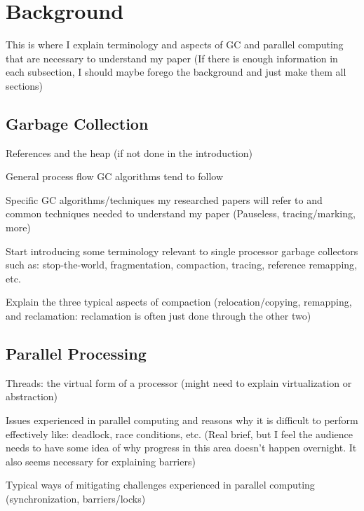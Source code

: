 \documentclass{sig-alternate}
\begin{document}
\section{Background}
\label{sec:background}


This is where I explain terminology and aspects of GC and parallel 
computing that are necessary to understand my paper (If there is 
enough information in each subsection, I should maybe forego the 
background and just make them all sections)

\subsection{Garbage Collection}
\label{sec:garbageCollection}

References and the heap (if not done in the introduction)

General process flow GC algorithms tend to follow

Specific GC algorithms/techniques my researched papers will 
refer to and common techniques needed to understand my paper 
(Pauseless, tracing/marking, more)

Start introducing some terminology relevant to single processor 
garbage collectors such as: stop-the-world, fragmentation, compaction, 
tracing, reference remapping, etc.

Explain the three typical aspects of compaction 
(relocation/copying, remapping, and reclamation: 
reclamation is often just done through the other two)

\subsection{Parallel Processing}
\label{sec:parallelProcessing}

Threads: the virtual form of a processor (might need to 
explain virtualization or abstraction)

Issues experienced in parallel computing and reasons why it 
is difficult to perform effectively like: deadlock, race conditions, 
etc. (Real brief, but I feel the audience needs to have some idea of 
why progress in this area doesn't happen overnight. It also seems 
necessary for explaining barriers)

Typical ways of mitigating challenges experienced in parallel 
computing (synchronization, barriers/locks)
\end{document}
